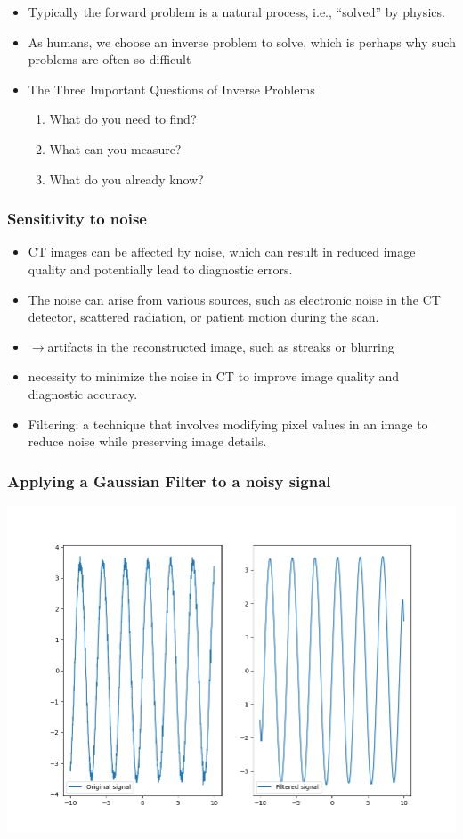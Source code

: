 \documentclass{beamer}
\begin{document}
\begin{frame}
	\begin{itemize}
		\item Typically the forward problem is a natural process, i.e., “solved” by physics. 
		 \pause
		\item As humans, we choose an inverse problem to solve, which is perhaps why such problems are often so difficult
		 \pause
		\item The Three Important Questions of Inverse Problems
			\begin{enumerate}
				\item What do you need to find?
		 \pause
				\item What can you measure?
		 \pause
				\item What do you already know?
			\end{enumerate}
	\end{itemize}
\end{frame}
\begin{frame}
	\frametitle{Sensitivity to noise}
	\begin{itemize}
		\item CT images can be affected by noise, which can result in reduced image quality and potentially lead to diagnostic errors.
		 \pause
		\item The noise can arise from various sources, such as electronic noise in the CT detector, scattered radiation, or patient motion during the  scan.
		 \pause
		\item $\rightarrow $artifacts in the reconstructed image, such as streaks or blurring
		\item necessity to minimize the noise in CT to improve image quality and diagnostic accuracy.
		 \pause
		\item Filtering: a technique that involves modifying pixel values in an image to reduce noise while preserving image details.
	\end{itemize}
\end{frame}
\begin{frame}
	\frametitle{Applying a Gaussian Filter to a noisy signal}
	\center
\includegraphics[scale= 0.4]{media/noise_separated.png}
\end{frame}
\end{document}
